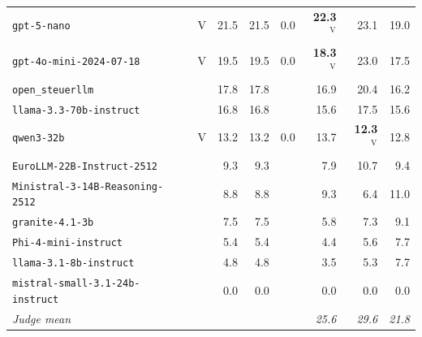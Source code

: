 \begin{table}[htbp]
{\begin{tabular}{lcrrr@{\hspace{2em}}rrr}
\texttt{gpt-5-nano} & $\mathrm{V}$ & \cellcolor[HTML]{72C8BD}21.5 & \cellcolor[HTML]{72C8BD}21.5 & $0.0$ & \cellcolor[HTML]{6BC6BE}\textbf{22.3}$^{\mathrm{V}}$ & \cellcolor[HTML]{63C3BF}23.1 & \cellcolor[HTML]{8BD2BA}19.0 \\
\texttt{gpt-4o-mini-2024-07-18} & $\mathrm{V}$ & \cellcolor[HTML]{85D0BA}19.5 & \cellcolor[HTML]{85D0BA}19.5 & $0.0$ & \cellcolor[HTML]{92D5B9}\textbf{18.3}$^{\mathrm{V}}$ & \cellcolor[HTML]{64C3BF}23.0 & \cellcolor[HTML]{9AD8B8}17.5 \\
\texttt{open\_steuerllm} &  & \cellcolor[HTML]{98D7B8}17.8 & \cellcolor[HTML]{98D7B8}17.8 &  & \cellcolor[HTML]{A1DBB8}16.9 & \cellcolor[HTML]{7CCCBB}20.4 & \cellcolor[HTML]{A9DEB7}16.2 \\
\texttt{llama-3.3-70b-instruct} &  & \cellcolor[HTML]{A2DBB7}16.8 & \cellcolor[HTML]{A2DBB7}16.8 &  & \cellcolor[HTML]{B0E0B6}15.6 & \cellcolor[HTML]{9AD8B8}17.5 & \cellcolor[HTML]{B0E0B6}15.6 \\
\texttt{qwen3-32b} & $\mathrm{V}$ & \cellcolor[HTML]{C7EAB4}13.2 & \cellcolor[HTML]{C7EAB4}13.2 & $0.0$ & \cellcolor[HTML]{C3E8B4}13.7 & \cellcolor[HTML]{CCEBB4}\textbf{12.3}$^{\mathrm{V}}$ & \cellcolor[HTML]{CAEAB4}12.8 \\
\texttt{EuroLLM-22B-Instruct-2512} &  & \cellcolor[HTML]{DEF2B2}9.3 & \cellcolor[HTML]{DEF2B2}9.3 &  & \cellcolor[HTML]{E6F5B2}7.9 & \cellcolor[HTML]{D6EFB3}10.7 & \cellcolor[HTML]{DEF2B2}9.4 \\
\texttt{Ministral-3-14B-Reasoning-2512} &  & \cellcolor[HTML]{E1F3B2}8.8 & \cellcolor[HTML]{E1F3B2}8.8 &  & \cellcolor[HTML]{DEF2B2}9.3 & \cellcolor[HTML]{EEF8B3}6.4 & \cellcolor[HTML]{D4EFB3}11.0 \\
\texttt{granite-4.1-3b} &  & \cellcolor[HTML]{E8F6B1}7.5 & \cellcolor[HTML]{E8F6B1}7.5 &  & \cellcolor[HTML]{EFF9B7}5.8 & \cellcolor[HTML]{EAF7B1}7.3 & \cellcolor[HTML]{DFF3B2}9.1 \\
\texttt{Phi-4-mini-instruct} &  & \cellcolor[HTML]{F0F9B9}5.4 & \cellcolor[HTML]{F0F9B9}5.4 &  & \cellcolor[HTML]{F3FABF}4.4 & \cellcolor[HTML]{F0F9B8}5.6 & \cellcolor[HTML]{E8F6B1}7.7 \\
\texttt{llama-3.1-8b-instruct} &  & \cellcolor[HTML]{F2FABC}4.8 & \cellcolor[HTML]{F2FABC}4.8 &  & \cellcolor[HTML]{F6FBC4}3.5 & \cellcolor[HTML]{F1F9B9}5.3 & \cellcolor[HTML]{E8F6B1}7.7 \\
\texttt{mistral-small-3.1-24b-instruct} &  & \cellcolor[HTML]{FFFFD9}0.0 & \cellcolor[HTML]{FFFFD9}0.0 &  & \cellcolor[HTML]{FFFFD9}0.0 & \cellcolor[HTML]{FFFFD9}0.0 & \cellcolor[HTML]{FFFFD9}0.0 \\
\midrule
\emph{Judge mean} &  &  &  &  & \emph{25.6} & \emph{29.6} & \emph{21.8} \\
\bottomrule
\end{tabular}}
\end{table}

